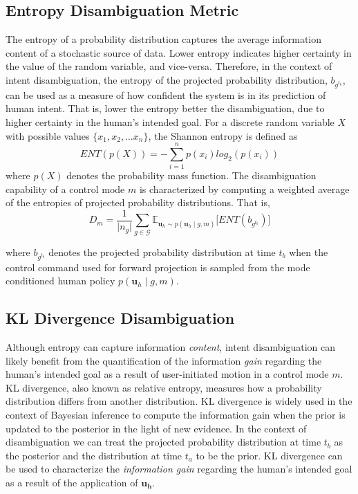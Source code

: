 \documentclass[letterpaper, 10 pt, conference]{ieeeconf}  %
\begin{document}
\subsection{Entropy Disambiguation Metric}\label{sssec:ent}
The entropy of a probability distribution captures the average information content of a stochastic source of data. Lower entropy indicates higher certainty in the value of the random variable, and vice-versa. Therefore, in the context of intent disambiguation, the entropy of the projected probability distribution, $b_{g^{t_b}}$, can be used as a measure of how confident the system is in its prediction of human intent. 
That is, lower the entropy better the disambiguation, due to higher certainty in the human's intended goal. For a discrete random variable $X$ with possible values $\{x_1, x_2,\dots x_n\}$, the Shannon entropy is defined as 
\begin{equation*}
	ENT(p(X)) = -\sum_{i = 1}^{n} p(x_i)log_2(p(x_i))
\end{equation*}
where $p(X)$ denotes the probability mass function.
The disambiguation capability of a control mode $m$ is characterized by computing a weighted average of the entropies of projected probability distributions. That is, 
\begin{equation}\label{eq:ent}
	D_m = \frac{1}{\vert n_g \vert} \sum_{g \in \mathcal{G}}^{} \mathbb{E}_{\boldsymbol{u}_h \sim p(\boldsymbol{u}_h \; | \; g, m)}\Big[ENT(b_{g^{t_b}})\Big]
\end{equation}

where $b_{g^{t_b}}$ denotes the projected probability distribution at time $t_b$ when the control command used for forward projection is sampled from the mode conditioned human policy $p(\boldsymbol{u}_h \; |\; g, m)$.

\subsection{KL Divergence Disambiguation}\label{sssec:kl}
Although entropy can capture information \textit{content}, intent disambiguation can likely benefit from the quantification of the information \textit{gain} regarding the human's intended goal as a result of user-initiated motion in a control mode $m$. 
KL divergence, also known as relative entropy, measures how a probability distribution differs from another distribution. KL divergence is widely used in the context of Bayesian inference to compute the information gain when the prior is updated to the posterior in the light of new evidence. In the context of disambiguation we can treat the projected probability distribution at time $t_b$ as the posterior and the distribution at time $t_a$ to be the prior. KL divergence can be used to characterize the \textit{information gain} regarding the human's intended goal as a result of the application of $\boldsymbol{u_h}$.
\end{document}
